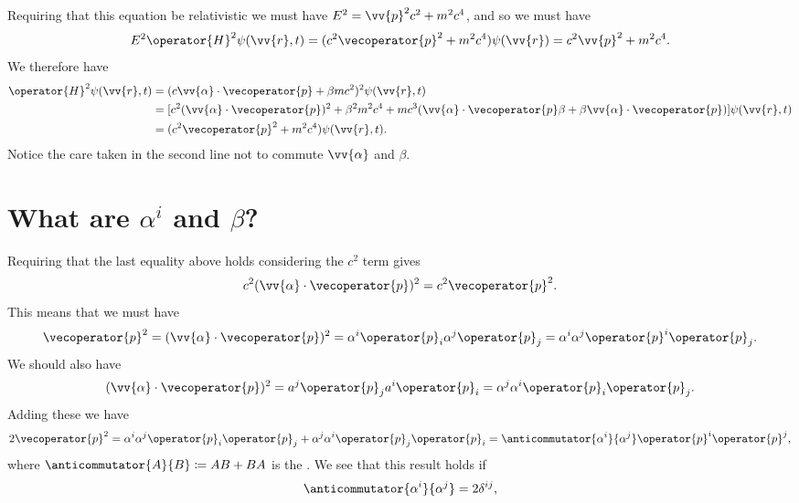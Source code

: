 \documentclass[fleqn]{NotesClass}
\newcommand*{\hamiltonian}{H}
\begin{document}
    Requiring that this equation be relativistic we must have \(E^2 = \vv{p}^2c^2 + m^2c^4\), and so we must have
    \begin{equation}
        E^2  \operator{\hamiltonian}^2\psi(\vv{r}, t) = (c^2\vecoperator{p}^2 + m^2c^4)\psi(\vv{r}) = c^2\vv{p}^2 + m^2c^4.
    \end{equation}
    We therefore have
    \begin{align}
        \operator{\hamiltonian}^2\psi(\vv{r}, t) &= (c\vv{\alpha} \cdot \vecoperator{p} + \beta mc^2)^2 \psi(\vv{r}, t)\\
        &= [c^2(\vv{\alpha} \cdot \vecoperator{p})^2 + \beta^2m^2c^4 + mc^3(\vv{\alpha}\cdot\vecoperator{p}\beta + \beta\vv{\alpha}\cdot\vecoperator{p})] \psi(\vv{r}, t)\\
        &= (c^2\vecoperator{p}^2 + m^2c^4)\psi(\vv{r}, t).
    \end{align}
    Notice the care taken in the second line not to commute \(\vv{\alpha}\) and \(\beta\).
    
    \section{What are \texorpdfstring{\lowercase{\(\alpha^i\)}}{alpha^i} and \texorpdfstring{\(\beta\)}{beta}?}
    Requiring that the last equality above holds considering the \(c^2\) term gives
    \begin{equation}
        c^2(\vv{\alpha} \cdot \vecoperator{p})^2 = c^2\vecoperator{p}^2.
    \end{equation}
    This means that we must have
    \begin{equation}
        \vecoperator{p}^2 = (\vv{\alpha} \cdot \vecoperator{p})^2 = \alpha^i\operator{p}_i\alpha^j\operator{p}_j = \alpha^i\alpha^j\operator{p}^i\operator{p}_j.
    \end{equation}
    We should also have
    \begin{equation}
        (\vv{\alpha} \cdot \vecoperator{p})^2 = a^j\operator{p}_ja^i\operator{p}_i = \alpha^j\alpha^i\operator{p}_i\operator{p}_j.
    \end{equation}
    Adding these we have
    \begin{equation}
        2\vecoperator{p}^2 = \alpha^i\alpha^j\operator{p}_i\operator{p}_j + \alpha^j\alpha^i\operator{p}_j\operator{p}_i = \anticommutator{\alpha^i}{\alpha^j}\operator{p}^i\operator{p}^j,
    \end{equation}
    where \(\anticommutator{A}{B} \coloneqq AB + BA\) is the .
    We see that this result holds if
    \begin{equation}
        \anticommutator{\alpha^i}{\alpha^j} = 2\delta^{ij},
    \end{equation}
    
\end{document}
